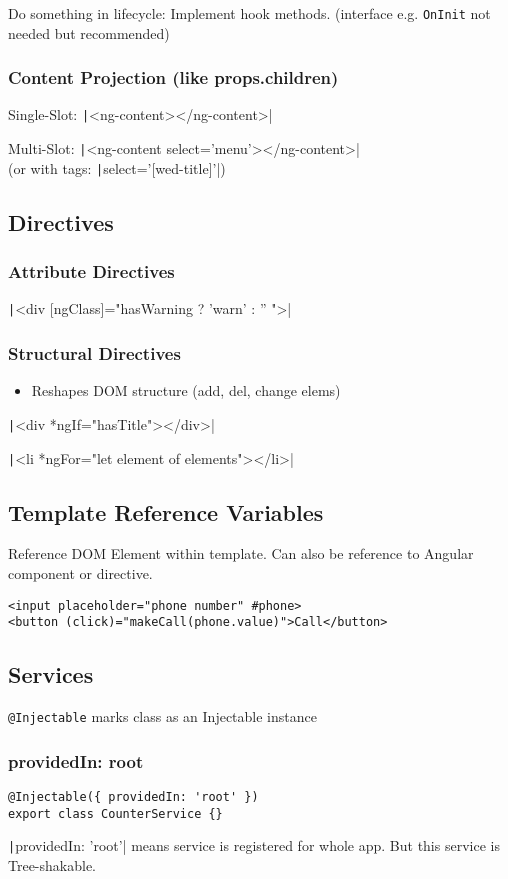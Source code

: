 \begin{multicols*}{2}
Do something in lifecycle: Implement hook methods. (interface e.g. \lstinline|OnInit| not needed but recommended)

\subsubsection{Content Projection (like props.children)}
Single-Slot: \texttt|<ng-content></ng-content>|

Multi-Slot:
\texttt|<ng-content select='menu'></ng-content>| \\
(or with tags: \texttt|select='[wed-title]'|)

\subsection{Directives}
\subsubsection{Attribute Directives}
\texttt|<div [ngClass]="hasWarning ? 'warn' : '' ">|
\subsubsection{Structural Directives}
\begin{itemize}
    \item Reshapes DOM structure (add, del, change elems)
\end{itemize}
\texttt|<div *ngIf="hasTitle"></div>|

\texttt|<li *ngFor="let element of elements"></li>|


\subsection{Template Reference Variables}
Reference DOM Element within template. Can also be reference to Angular component or directive.
\begin{verbatim}
<input placeholder="phone number" #phone>
<button (click)="makeCall(phone.value)">Call</button>
\end{verbatim}

\subsection{Services}
\lstinline|@Injectable| marks class as an Injectable instance

\subsubsection{providedIn: root}
\begin{verbatim}
@Injectable({ providedIn: 'root' })
export class CounterService {}
\end{verbatim}
\texttt|{providedIn: 'root'}| means service is registered for whole app. But this service is Tree-shakable.


\end{multicols*}
